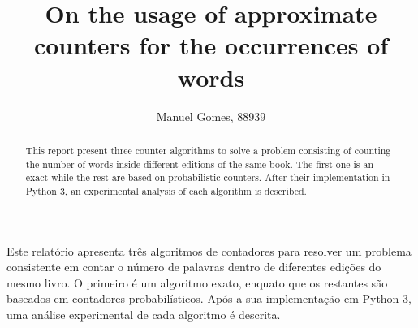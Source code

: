 \documentclass[shortpaper,english,final]{revdetua}
\begin{document}

\title{On the usage of approximate counters for the occurrences of words}
\author{Manuel Gomes, 88939} %
\maketitle

\begin{abstract}%
This report present three counter algorithms to solve a problem consisting of counting the number of words inside different editions of the same book.
The first one is an exact while the rest are based on probabilistic counters.
After their implementation in Python 3, an experimental analysis of each algorithm is described.
\end{abstract}

\begin{resumo}%
Este relatório apresenta três algoritmos de contadores para resolver um problema consistente em contar o número de palavras dentro de diferentes edições do mesmo livro.
O primeiro é um algoritmo exato, enquato que os restantes são baseados em contadores probabilísticos.
Após a sua implementação em Python 3, uma análise experimental de cada algoritmo é descrita.
\end{resumo}











\end{document}
